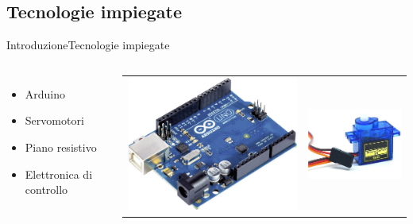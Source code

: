 \documentclass[10pt,aspectratio=169
	]{beamer}
\begin{document}
	\subsection{Tecnologie impiegate}
	\begin{frame}{Introduzione}{Tecnologie impiegate}

	\begin{columns}
	
	\begin{itemize}
		\item Arduino
		\item Servomotori
		\item Piano resistivo
		\item Elettronica di controllo
	\end{itemize}
	\begin{tabular}{cc}
	\hspace{0.5cm}
  \includegraphics[height=0.3\textheight]{images/1.jpg}
  &
  \hspace{0.3cm}
  \includegraphics[height=0.3\textheight]{images/2.jpg}
 \end{tabular}


\end{columns}
\end{frame}
\end{document}
